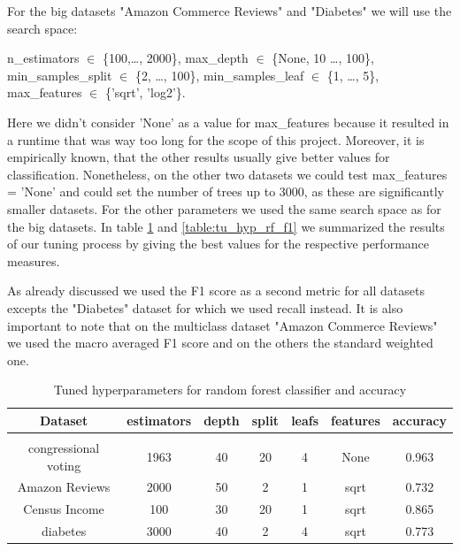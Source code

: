 \documentclass[a4paper,10pt]{article}
\begin{document}
For the big datasets "Amazon Commerce Reviews" and "Diabetes" we will use the search space:
 

\begin{center}
    \parbox{0.75\textwidth}{%
    \raggedright
    \textsf{n\_estimators} \(\in\) \{100,\dots, 2000\}, \textsf{max\_depth} \(\in\) \{None, 10 \dots , 100\}, \\
    \textsf{min\_samples\_split} \(\in\) \{2, \dots, 100\}, \textsf{min\_samples\_leaf} \(\in\) \{1, \dots, 5\}, \\
    \textsf{max\_features} \(\in\) \{'sqrt', 'log2'\}.}
\end{center}

Here we didn't consider 'None' as a value for \textsf{max\_features} because it resulted in a runtime that was way too long for the scope of this project. Moreover, it is empirically known, that the other results usually give better values for classification. Nonetheless, on the other two datasets we could test \textsf{max\_features} = 'None' and could set the number of trees up to 3000, as these are significantly smaller datasets. For the other parameters we used the same search space as for the big datasets. In table \ref{table:tu_hyp_rf_ac} and \ref{table:tu_hyp_rf_f1} we summarized the results of our tuning process by giving the best values for the respective performance measures.

As already discussed we used the F1 score as a second metric for all datasets excepts the "Diabetes" dataset for which we used recall instead. It is also important to note that on the multiclass dataset "Amazon Commerce Reviews" we used the macro averaged F1 score and on the others the standard weighted one.

\begin{table}[h!]
    \centering
    \begin{tabular}{|c|c|c|c|c|c|c|}
    \hline
    Dataset & \textsf{estimators} & \textsf{depth} & \textsf{split} & \textsf{leafs} & \textsf{features} & accuracy \\
    \hline
    \multicolumn{7}{c}{\vspace{-0.4cm}} \\ %
    \hline
    congressional voting & 1963 & 40 & 20 & 4 & None & 0.963 \\%
    \hline
    Amazon Reviews & 2000 & 50 & 2 & 1 & sqrt & 0.732 \\%
    \hline
    Census Income & 100 & 30 & 20 & 1 & sqrt & 0.865 \\%
    \hline
    diabetes & 3000 & 40 & 2 & 4 & sqrt & 0.773 \\%
    \hline
    \end{tabular}
    \caption{Tuned hyperparameters for random forest classifier and accuracy} 
    \label{table:tu_hyp_rf_ac}
    \end{table}
\end{document}

